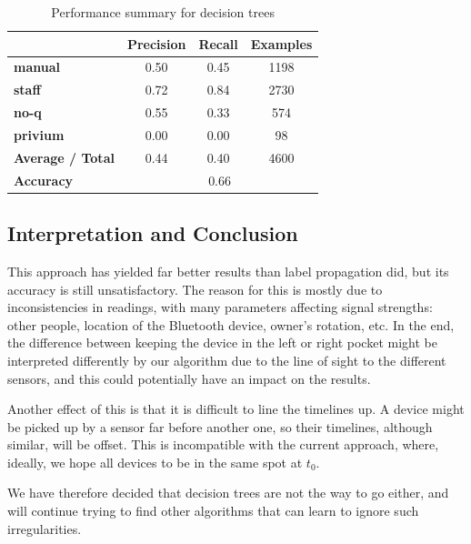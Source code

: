 \begin{table}[H]
    \centering 
    \begin{tabular}{c|c|c|c|}
        \cline{2-4}
                                                     & \textbf{Precision} & \textbf{Recall} & \textbf{Examples} \\ \hline
        \multicolumn{1}{|l|}{\textbf{manual}}        & 0.50               & 0.45            & 1198              \\ \hline
        \multicolumn{1}{|l|}{\textbf{staff}}         & 0.72               & 0.84            & 2730              \\ \hline
        \multicolumn{1}{|l|}{\textbf{no-q}}          & 0.55               & 0.33            & 574               \\ \hline
        \multicolumn{1}{|l|}{\textbf{privium}}       & 0.00               & 0.00            & 98                \\ 
        \hline \hline
        \multicolumn{1}{|l|}{\textbf{Average / Total}} & 0.44               & 0.40            & 4600               \\ 
        \hline \hline
        \multicolumn{1}{|l|}{\textbf{Accuracy}}      & \multicolumn{3}{c|}{0.66}                                \\ \hline
    \end{tabular}   
    \caption{Performance summary for decision trees}
\end{table}
\subsection{Interpretation and Conclusion}
This approach has yielded far better results than label propagation did, but its accuracy is still unsatisfactory. The reason for this is mostly due to inconsistencies in readings, with many parameters affecting signal strengths: other people, location of the Bluetooth device, owner's rotation, etc. In the end, the difference between keeping the device in the left or right pocket might be interpreted differently by our algorithm due to the line of sight to the different sensors, and this could potentially have an impact on the results. \par
\medskip
Another effect of this is that it is difficult to line the timelines up. A device might be picked up by a sensor far before another one, so their timelines, although similar, will be offset. This is incompatible with the current approach, where, ideally, we hope all devices to be in the same spot at $t_0$.\par
\medskip
We have therefore decided that decision trees are not the way to go either, and will continue trying to find other algorithms that can learn to ignore such irregularities.